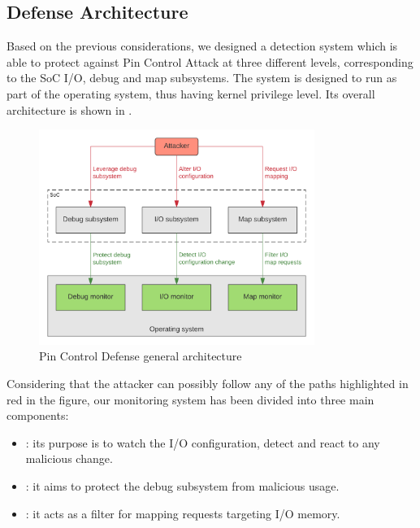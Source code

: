 \subsection{Defense Architecture}
\label{sec:def_arch}

Based on the previous considerations, we designed a detection system which is able to protect against Pin Control Attack at three different levels,
corresponding to the SoC I/O, debug and map subsystems. The system is designed to run as part of the operating system, thus having kernel privilege level.
Its overall architecture is shown in .
\begin{figure}[h]
\centerline{\includegraphics[width=0.8\textwidth]{res/defense}}
\caption{Pin Control Defense general architecture \label{fig:defense}}
\end{figure}
Considering that the attacker can possibly follow any of the paths highlighted in red in the figure,
our monitoring system has been divided into three main components:
\begin{itemize}
	\item {}: its purpose is to watch the I/O configuration, detect and react to any malicious change.
	\item {}: it aims to protect the debug subsystem from malicious usage.
	\item {}: it acts as a filter for mapping requests targeting I/O memory.
\end{itemize}

